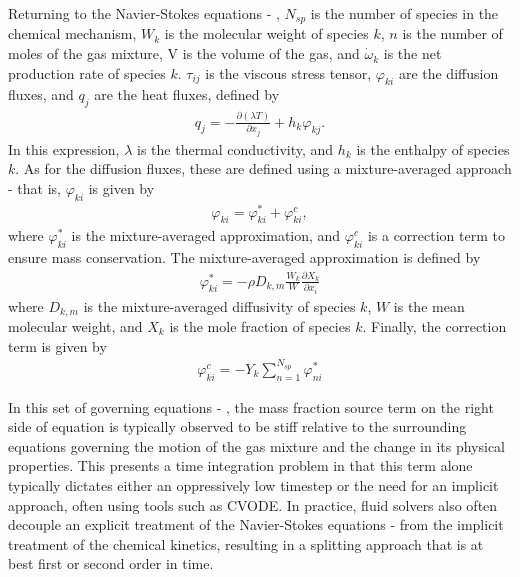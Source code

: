 Returning to the Navier-Stokes equations  - , $N_{sp}$ is the number of species
in the chemical mechanism, $W_{k}$ is the molecular weight of species $k$, $n$ is the number of moles of the gas
mixture, V is the volume of the gas, and $\dot{\omega}_{k}$ is the net production rate of species $k$. $\tau_{ij}$
is the viscous stress tensor, $\varphi_{ki}$ are the diffusion fluxes, and $q_{j}$ are the heat fluxes, defined by
\begin{align}
q_{j} = - \frac{\partial (\lambda T)}{\partial x_{j}} + h_{k}\varphi_{kj}.
\end{align}
In this expression, $\lambda$ is the thermal conductivity, and $h_{k}$ is the enthalpy of species $k$.
As for the diffusion fluxes, these are defined using a mixture-averaged approach - that is, $\varphi_{ki}$
is given by
\begin{align}
\varphi_{ki} = \varphi_{ki}^{*} + \varphi_{ki}^{c},
\end{align}
where $\varphi_{ki}^{*}$ is the mixture-averaged approximation, and $\varphi_{ki}^{c}$
is a correction term to ensure mass conservation. The mixture-averaged approximation
is defined by
\begin{align}
\varphi_{ki}^{*} = -\rho D_{k,m}\frac{W_{k}}{W} \frac{\partial X_{k}}{\partial x_{i}}
\end{align}
where $D_{k,m}$ is the mixture-averaged diffusivity of species $k$, $W$ is the mean
molecular weight, and $X_{k}$ is the mole fraction of species $k$. Finally, the
correction term is given by
\begin{align}
\varphi_{ki}^{c} = -Y_{k} \sum_{n=1}^{N_{sp}} \varphi_{ni}^{*}
\end{align}


In this set of governing equations  - , the mass fraction source term
on the right side of equation  is typically observed
to be stiff relative to the surrounding equations governing the motion of the gas mixture
and the change in its physical properties. This presents a time integration problem in
that this term alone typically dictates either an oppressively low timestep or the need for
an implicit approach, often using tools such as CVODE. In practice, fluid solvers
also often decouple an explicit treatment of the Navier-Stokes equations  - 
from the implicit treatment of the chemical kinetics, resulting in a splitting
approach that is at best first or second order in time.

